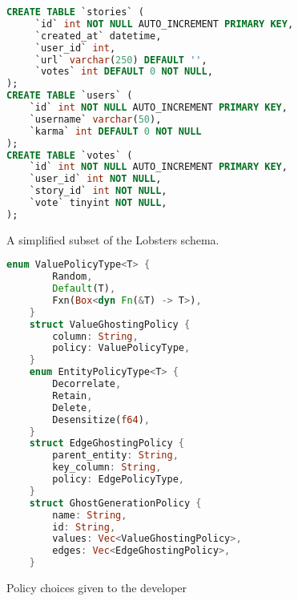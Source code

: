 \begin{figure}
\begin{lstlisting}[language=SQL, numbers=none]
CREATE TABLE `stories` (
     `id` int NOT NULL AUTO_INCREMENT PRIMARY KEY, 
     `created_at` datetime, 
     `user_id` int, 
     `url` varchar(250) DEFAULT '', 
     `votes` int DEFAULT 0 NOT NULL, 
);
CREATE TABLE `users` (
    `id` int NOT NULL AUTO_INCREMENT PRIMARY KEY, 
    `username` varchar(50), 
    `karma` int DEFAULT 0 NOT NULL
);
CREATE TABLE `votes` (
    `id` int NOT NULL AUTO_INCREMENT PRIMARY KEY,
    `user_id` int NOT NULL, 
    `story_id` int NOT NULL,
    `vote` tinyint NOT NULL,
);
\end{lstlisting}
\caption{A simplified subset of the Lobsters schema.}
\label{fig:schema}
\end{figure}

\begin{figure}
\begin{lstlisting}[language=rust, numbers=none]
    enum ValuePolicyType<T> {
        Random,
        Default(T),
        Fxn(Box<dyn Fn(&T) -> T>),
    }
    struct ValueGhostingPolicy {
        column: String,
        policy: ValuePolicyType,
    }
    enum EntityPolicyType<T> {
        Decorrelate,
        Retain,
        Delete,
        Desensitize(f64),
    }
    struct EdgeGhostingPolicy {
        parent_entity: String,
        key_column: String,
        policy: EdgePolicyType,
    }
    struct GhostGenerationPolicy {
        name: String,
        id: String,
        values: Vec<ValueGhostingPolicy>,
        edges: Vec<EdgeGhostingPolicy>,
    }
\end{lstlisting}
    \caption{Policy choices given to the developer}
\label{fig:policy}
\end{figure}

